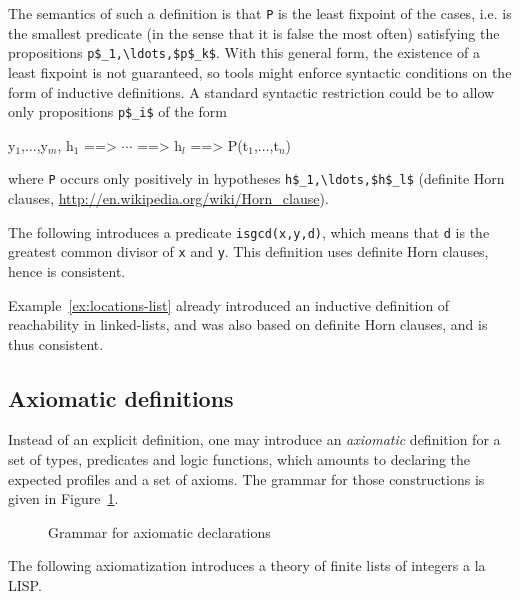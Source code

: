 The semantics of such a definition is that \lstinline|P| is the least fixpoint
of the cases, i.e. is the smallest predicate (in the sense that it is
false the most often) satisfying the propositions \lstinline|p$_1,\ldots,$p$_k$|.
With this general form, the existence of a least fixpoint is not
guaranteed, so tools might enforce syntactic conditions on the form of
inductive definitions. A standard syntactic restriction could be to
allow only propositions \lstinline|p$_i$| of the form
\begin{listing-nonumber}
\forall y$_1$,$\dots$,y$_m$, h$_1$ ==> $\cdots$ ==> h$_l$ ==> P(t$_1$,$\dots$,t$_n$)
\end{listing-nonumber}
where \lstinline|P| occurs only positively in hypotheses \lstinline|h$_1,\ldots,$h$_l$|
(definite Horn clauses,
\url{http://en.wikipedia.org/wiki/Horn_clause}).

\begin{example}
  The following introduces a predicate \lstinline|isgcd(x,y,d)|, which means
  that \lstinline|d| is the greatest common divisor of \lstinline|x|
  and \lstinline|y|.
  This definition uses definite Horn clauses, hence is consistent.
\end{example}

Example~\ref{ex:locations-list} already introduced an inductive definition of
reachability in linked-lists, and was also based on definite Horn
clauses, and is thus consistent.

\subsection{Axiomatic definitions}\label{sec:axiomatic}

Instead of an explicit definition, one may introduce an
\emph{axiomatic} definition for a set of types, predicates and logic
functions, which amounts to declaring the expected profiles and a set of
axioms. The grammar for those constructions is given in
Figure~\ref{fig:gram:logicdecl}.

\begin{figure}[htp]
  \begin{cadre}
    
    \end{cadre}
  \caption{Grammar for axiomatic declarations}
\label{fig:gram:logicdecl}
\end{figure}

\begin{example}
  The following axiomatization introduces a theory of finite lists of
  integers a la LISP.
\end{example}

